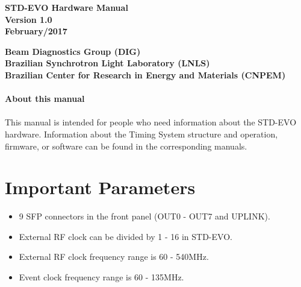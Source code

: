 \documentclass[openany]{article}
\begin{document}
\begin{titlepage}

\thispagestyle{fancy}

\begin{center}

\vspace*{\fill}
\textbf{\Huge STD-EVO Hardware Manual}\\[20pt]
\textbf{\Huge Version 1.0}\\[20pt]
\textbf{\Huge February/2017}
\vspace*{\fill}

\vfill
\textbf{Beam Diagnostics Group (DIG)}\\[5pt]
\textbf{Brazilian Synchrotron Light Laboratory (LNLS)}\\[5pt]
\textbf{Brazilian Center for Research in Energy and Materials (CNPEM)}
\end{center}

\end{titlepage}

\newpage
\pagestyle{plain} %

\paragraph{}{\Large\bfseries About this manual}

\paragraph{} This manual is intended for people who need information about the STD-EVO hardware. Information about the Timing System structure and operation, firmware, or software can be found in the corresponding manuals.

\tableofcontents

\newpage
\section{Important Parameters}

\begin{itemize}
\item 9 SFP connectors in the front panel (OUT0 - OUT7 and UPLINK).
\item External RF clock can be divided by 1 - 16 in STD-EVO.
\item External RF clock frequency range is 60 - 540MHz.
\item Event clock frequency range is 60 - 135MHz.
\end{itemize}
\end{document}
